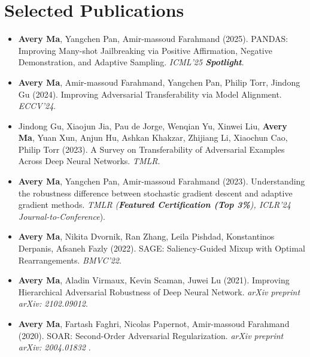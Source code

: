 \section*{Selected Publications}
    \vspace{\postsubhead}
    \begin{adjustwidth}{\indentleft}{\indentright}
        \begin{itemize}
            \setlength\itemsep{0.5em}

            \item \textbf{Avery Ma}, Yangchen Pan, Amir-massoud Farahmand (2025). PANDAS: Improving Many-shot Jailbreaking via Positive Affirmation, Negative Demonstration, and Adaptive Sampling. \emph{ICML'25 \textbf{Spotlight}}.
            
            \item \textbf{Avery Ma}, Amir-massoud Farahmand, Yangchen Pan, Philip Torr, Jindong Gu (2024). Improving Adversarial Transferability via Model Alignment. \emph{ECCV'24}.

            \item Jindong Gu, Xiaojun Jia, Pau de Jorge, Wenqian Yu, Xinwei Liu, \textbf{Avery Ma}, Yuan Xun, Anjun Hu, Ashkan Khakzar, Zhijiang Li, Xiaochun Cao, Philip Torr (2023). A Survey on Transferability of Adversarial Examples Across Deep Neural Networks. \emph{TMLR}.
            
            \item \textbf{Avery Ma}, Yangchen Pan, Amir-massoud Farahmand (2023). Understanding the robustness difference between stochastic gradient descent and adaptive gradient methods. \emph{TMLR (\textbf{Featured Certification (Top 3\%}), ICLR'24 Journal-to-Conference}).
            
            \item \textbf{Avery Ma}, Nikita Dvornik, Ran Zhang, Leila Pishdad, Konstantinos Derpanis, Afsaneh Fazly (2022). SAGE: Saliency-Guided Mixup with Optimal Rearrangements. \emph{BMVC'22}.
            
            \item \textbf{Avery Ma}, Aladin Virmaux, Kevin Scaman, Juwei Lu (2021). Improving Hierarchical Adversarial Robustness of Deep Neural Network. \emph{arXiv preprint arXiv: 2102.09012}.
            
            \item \textbf{Avery Ma}, Fartash Faghri, Nicolas Papernot, Amir-massoud Farahmand (2020). SOAR: Second-Order Adversarial Regularization. \emph{arXiv preprint arXiv: 2004.01832} .
            

\end{itemize}
\end{adjustwidth}
